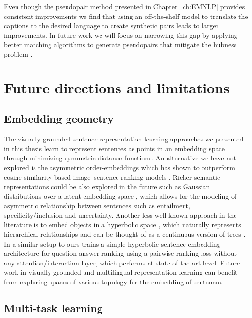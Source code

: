Even though the pseudopair method presented in Chapter~\ref{ch:EMNLP} provides consistent improvements
we find that using an off-the-shelf model to translate the captions to the desired language to create 
synthetic pairs leads to larger improvements. In future work we will focus on narrowing this gap by applying
better matching algorithms to generate pseudopairs that mitigate the hubness problem \citep{radovanovic2010existence,tomavsev2011influence,tomavsev2011probabilistic,dinu2014improving}. 

 

\section{Future directions and limitations}

\subsection{Embedding geometry}

The visually grounded sentence representation learning approaches 
we presented in this thesis learn to represent sentences as points
in an embedding space through minimizing symmetric distance functions. 
An alternative we have not explored is the asymmetric order-embeddings 
\citep{vendrov2016order} which has shown to outperform cosine similarity based 
image--sentence ranking models \citep{faghri2017vse++}. 
Richer semantic representations could be also explored in the future such as Gaussian 
distributions over a latent embedding 
space \citep{vilnis2014word}, which allows for the modeling of asymmetric relationship between sentences
such as entailment, specificity/inclusion and uncertainty. 
Another less well known approach in the literature is to embed objects in a
hyperbolic space \citep{nickel2017poincare}, which naturally represents hierarchical relationships and 
can be thought of as a continuous version of trees \citep{krioukov2010hyperbolic}. 
In a similar setup to ours \cite{tay2018hyperbolic} 
trains a simple hyperbolic sentence embedding architecture for question-answer 
ranking using a pairwise ranking loss without any attention/interaction layer, 
which performs at state-of-the-art level.
Future work in visually grounded and multilingual representation learning can benefit from exploring
spaces of various topology for the embedding of sentences. 



\subsection{Multi-task learning}

